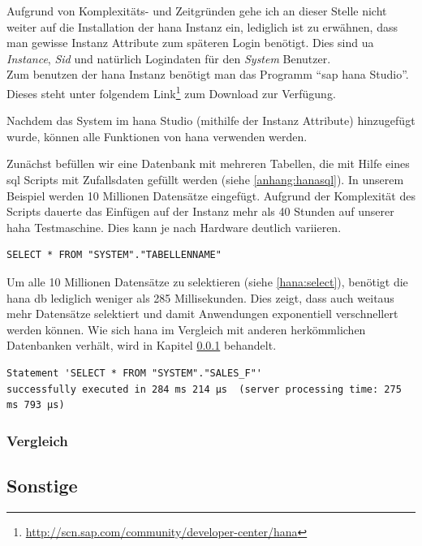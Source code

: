 Aufgrund von Komplexitäts- und Zeitgründen gehe ich an dieser Stelle nicht weiter auf die Installation der \gls{hana} Instanz ein, lediglich ist zu erwähnen, dass man gewisse Instanz Attribute zum späteren Login benötigt. Dies sind \gls{ua} \emph{Instance}, \emph{Sid} und natürlich Logindaten für den \emph{System} Benutzer.\\
Zum benutzen der \gls{hana} Instanz benötigt man das Programm "`\gls{sap} \gls{hana} Studio"'. Dieses steht unter folgendem Link\footnote{\url{http://scn.sap.com/community/developer-center/hana}} zum Download zur Verfügung.

Nachdem das System im \gls{hana} Studio (mithilfe der Instanz Attribute) hinzugefügt wurde, können alle Funktionen von \gls{hana} verwenden werden.

Zunächst befüllen wir eine Datenbank mit mehreren Tabellen, die mit Hilfe eines \gls{sql} Scripts mit Zufallsdaten gefüllt werden (siehe \ref{anhang:hanasql}). In unserem Beispiel werden 10 Millionen Datensätze eingefügt. Aufgrund der Komplexität des Scripts dauerte das Einfügen auf der Instanz mehr als 40 Stunden auf unserer \gls{haha} Testmaschine. Dies kann je nach Hardware deutlich variieren.\\

\begin{lstlisting}
SELECT * FROM "SYSTEM"."TABELLENNAME"
\end{lstlisting}

Um alle 10 Millionen Datensätze zu selektieren (siehe \ref{hana:select}), benötigt die \gls{hana} \gls{db} lediglich weniger als 285 Millisekunden. Dies zeigt, dass auch weitaus mehr Datensätze selektiert und damit Anwendungen exponentiell verschnellert werden können. Wie sich \gls{hana} im Vergleich mit anderen herkömmlichen Datenbanken verhält, wird in Kapitel \ref{sec:db-hana-vgl} behandelt.

\begin{verbatim}
Statement 'SELECT * FROM "SYSTEM"."SALES_F"' 
successfully executed in 284 ms 214 µs  (server processing time: 275 ms 793 µs)
\end{verbatim}

\subsubsection{Vergleich}
\label{sec:db-hana-vgl}

\subsection{Sonstige}
\label{sec:db-sonstige}
